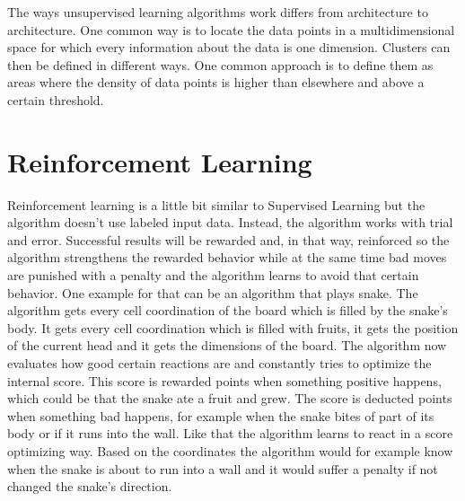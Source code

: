 \documentclass[a4paper,12pt]{report}
\begin{document}
	The ways unsupervised learning algorithms work differs from architecture to architecture. One common way is to locate the data points in a multidimensional space for which every information about the data is one dimension. Clusters can then be defined in different ways. One common approach is to define them as areas where the density of data points is higher than elsewhere and above a certain threshold.\\
	\section{Reinforcement Learning}
	Reinforcement learning is a little bit similar to Supervised Learning but the algorithm doesn't use labeled input data. Instead, the algorithm works with trial and error. Successful results will be rewarded and, in that way, reinforced so the algorithm strengthens the rewarded behavior while at the same time bad moves are punished with a penalty and the algorithm learns to avoid that certain behavior. One example for that can be an algorithm that plays snake. The algorithm gets every cell coordination of the board which is filled by the snake's body. It gets every cell coordination which is filled with fruits, it gets the position of the current head and it gets the dimensions of the board. The algorithm now evaluates how good certain reactions are and constantly tries to optimize the internal score. This score is rewarded points when something positive happens, which could be that the snake ate a fruit and grew. The score is deducted points when something bad happens, for example when the snake bites of part of its body or if it runs into the wall. Like that the algorithm learns to react in a score optimizing way. Based on the coordinates the algorithm would for example know when the snake is about to run into a wall and it would suffer a penalty if not changed the snake's direction.\\
	
\end{document}
